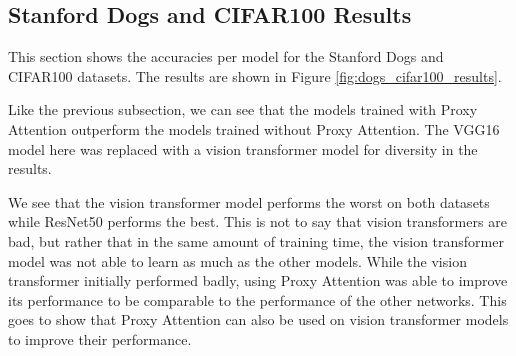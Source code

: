 \subsection{Stanford Dogs and CIFAR100 Results}
This section shows the accuracies per model for the Stanford Dogs \cite{khoslaNovelDatasetFineGrained} and CIFAR100 \cite{krizhevskyLearningMultipleLayers} datasets. The results are shown in Figure \ref{fig:dogs_cifar100_results}.

Like the previous subsection, we can see that the models trained with Proxy Attention outperform the models trained without Proxy Attention. The VGG16 model here was replaced with a vision transformer model for diversity in the results. 

We see that the vision transformer model performs the worst on both datasets while ResNet50 performs the best. This is not to say that vision transformers are bad, but rather that in the same amount of training time, the vision transformer model was not able to learn as much as the other models. 
While the vision transformer initially performed badly, using Proxy Attention was able to improve its performance to be comparable to the performance of the other networks. This goes to show that Proxy Attention can also be used on vision transformer models to improve their performance.
